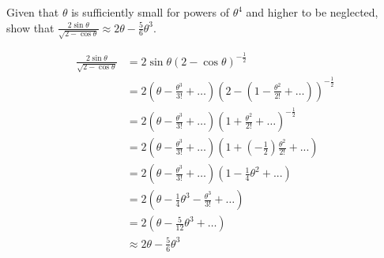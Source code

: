 \documentclass[11pt,a4paper]{book}
\begin{document}
\begin{example}

Given that $\theta$ is sufficiently small for powers of $\theta^{4}$
and higher to be neglected, show that ${\displaystyle \frac{2\sin\theta}{\sqrt{2-\cos\theta}}\approx2\theta-\frac{5}{6}\theta^{3}}$.

\medskip

\Solution

\begin{align*}
{\displaystyle \frac{2\sin\theta}{\sqrt{2-\cos\theta}}} & =2\sin\theta\left(2-\cos\theta\right)^{-\frac{1}{2}}\\
 & =2\left(\theta-\frac{\theta^{3}}{3!}+\ldots\right)\left(2-\left(1-\frac{\theta^{2}}{2!}+\ldots\right)\right)^{-\frac{1}{2}}\\
 & =2\left(\theta-\frac{\theta^{3}}{3!}+\ldots\right)\left(1+\frac{\theta^{2}}{2!}+\ldots\right)^{-\frac{1}{2}}\\
 & =2\left(\theta-\frac{\theta^{3}}{3!}+\ldots\right)\left(1+\left(-\frac{1}{2}\right)\frac{\theta^{2}}{2!}+...\right)\\
 & =2\left(\theta-\frac{\theta^{3}}{3!}+\ldots\right)\left(1-\frac{1}{4}\theta^{2}+...\right)\\
 & =2\left(\theta-\frac{1}{4}\theta^{3}-\frac{\theta^{3}}{3!}+\ldots\right)\\
 & =2\left(\theta-\frac{5}{12}\theta^{3}+\ldots\right)\\
 & \approx2\theta-\frac{5}{6}\theta^{3}
\end{align*}

\end{example}

\newpage
\end{document}
